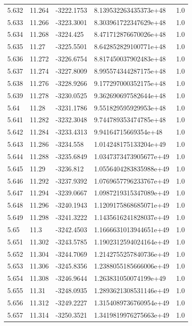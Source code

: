 \begin{tabular}{lllll}
5.632 & 11.264 & -3222.1753 & 8.139532263435373e+48 & 1.0 \\
5.633 & 11.266 & -3223.3001 & 8.303961722347629e+48 & 1.0 \\
5.634 & 11.268 & -3224.425 & 8.471712876670026e+48 & 1.0 \\
5.635 & 11.27 & -3225.5501 & 8.642852829100771e+48 & 1.0 \\
5.636 & 11.272 & -3226.6754 & 8.817450037902483e+48 & 1.0 \\
5.637 & 11.274 & -3227.8009 & 8.995574344287175e+48 & 1.0 \\
5.638 & 11.276 & -3228.9266 & 9.177297000352175e+48 & 1.0 \\
5.639 & 11.278 & -3230.0525 & 9.362690697582644e+48 & 1.0 \\
5.64 & 11.28 & -3231.1786 & 9.551829595929953e+48 & 1.0 \\
5.641 & 11.282 & -3232.3048 & 9.744789353474785e+48 & 1.0 \\
5.642 & 11.284 & -3233.4313 & 9.94164715669354e+48 & 1.0 \\
5.643 & 11.286 & -3234.558 & 1.014248175133204e+49 & 1.0 \\
5.644 & 11.288 & -3235.6849 & 1.0347373473905677e+49 & 1.0 \\
5.645 & 11.29 & -3236.812 & 1.0556404283835988e+49 & 1.0 \\
5.646 & 11.292 & -3237.9392 & 1.0769657796233767e+49 & 1.0 \\
5.647 & 11.294 & -3239.0667 & 1.0987219315347089e+49 & 1.0 \\
5.648 & 11.296 & -3240.1943 & 1.1209175868685071e+49 & 1.0 \\
5.649 & 11.298 & -3241.3222 & 1.1435616241828037e+49 & 1.0 \\
5.65 & 11.3 & -3242.4503 & 1.1666631013944651e+49 & 1.0 \\
5.651 & 11.302 & -3243.5785 & 1.1902312594024164e+49 & 1.0 \\
5.652 & 11.304 & -3244.7069 & 1.2142755257840736e+49 & 1.0 \\
5.653 & 11.306 & -3245.8356 & 1.2388055185666006e+49 & 1.0 \\
5.654 & 11.308 & -3246.9644 & 1.263831050074199e+49 & 1.0 \\
5.655 & 11.31 & -3248.0935 & 1.2893621308531146e+49 & 1.0 \\
5.656 & 11.312 & -3249.2227 & 1.3154089736760954e+49 & 1.0 \\
5.657 & 11.314 & -3250.3521 & 1.3419819976275663e+49 & 1.0 \\

\end{tabular}
